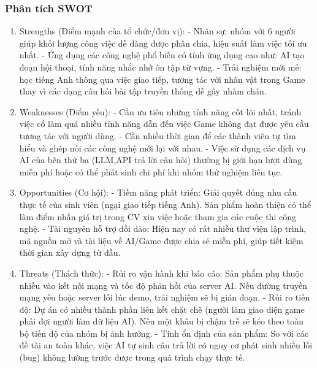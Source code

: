 \subsubsection{Phân tích SWOT}
\begin{enumerate}
\item Strengths (Điểm mạnh của tổ chức/đơn vị): \newline
- Nhân sự: nhóm với 6 người giúp khối lượng công việc dễ dàng được phân chia, hiệu suất làm việc tối ưu nhất. \newline
- Ứng dụng các công nghệ phổ biến có tính ứng dụng cao như: AI tạo đoạn hội thoại, tính năng nhắc nhở ôn tập từ vựng. \newline
- Trải nghiệm mới mẻ: học tiếng Anh thông qua việc giao tiếp, tương tác với nhân vật trong Game thay vì các dạng câu hỏi bài tập truyền thống dễ gây nhàm chán.

\item Weaknesses (Điểm yếu): \newline
- Cần ưu tiên những tính năng cốt lõi nhất, tránh việc cố làm quá nhiều tính năng dẫn đến việc Game không đạt được yêu cầu tương tác với người dùng. \newline
- Cần nhiều thời gian để các thành viên tự tìm hiểu và ghép nối các công nghệ mới lại với nhau. \newline
- Việc sử dụng các dịch vụ AI của bên thứ ba (LLM,API trả lời câu hỏi) thường bị giới hạn lượt dùng miễn phí hoặc có thể phát sinh chi phí khi nhóm thử nghiệm liên tục.

\item Opportunities (Cơ hội): \newline
- Tiềm năng phát triển: Giải quyết đúng nhu cầu thực tế của sinh viên (ngại giao tiếp tiếng Anh). Sản phẩm hoàn thiện có thể làm điểm nhấn giá trị trong CV xin việc hoặc tham gia các cuộc thi công nghệ. \newline
- Tài nguyên hỗ trợ dồi dào: Hiện nay có rất nhiều thư viện lập trình, mã nguồn mở và tài liệu về AI/Game được chia sẻ miễn phí, giúp tiết kiệm thời gian xây dựng từ đầu. \newline


\item Threats (Thách thức): \newline
- Rủi ro vận hành khi báo cáo: Sản phẩm phụ thuộc nhiều vào kết nối mạng và tốc độ phản hồi của server AI. Nếu đường truyền mạng yếu hoặc server lỗi lúc demo, trải nghiệm sẽ bị gián đoạn. \newline
- Rủi ro tiến độ: Dự án có nhiều thành phần liên kết chặt chẽ (người làm giao diện game phải đợi người làm dữ liệu AI). Nếu một khâu bị chậm trễ sẽ kéo theo toàn bộ tiến độ của nhóm bị ảnh hưởng. \newline
- Tính ổn định của sản phẩm: So với các đề tài an toàn khác, việc AI tự sinh câu trả lời có nguy cơ phát sinh nhiều lỗi (bug) không lường trước được trong quá trình chạy thực tế.
\end{enumerate}

